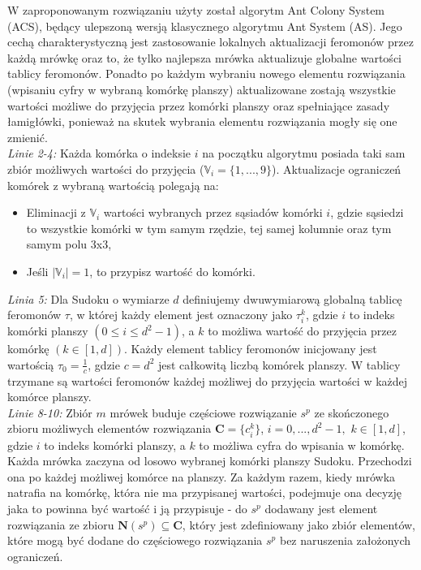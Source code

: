 \documentclass[11pt]{scrartcl} %
\begin{document}
W zaproponowanym rozwiązaniu użyty został algorytm Ant Colony System (ACS), będący ulepszoną wersją klasycznego algorytmu Ant System (AS). Jego cechą charakterystyczną jest zastosowanie lokal\-nych aktualizacji feromonów przez każdą mrówkę oraz to, że tylko najlepsza mrówka aktualizuje globalne wartości tablicy feromonów. Ponadto po każdym wybraniu nowego elementu rozwiązania (wpisaniu cyfry w wybraną komórkę planszy) aktualizowane zostają wszystkie wartości możliwe do przyjęcia przez komórki planszy oraz spełniające zasady łamigłówki, ponieważ na skutek wybrania elementu rozwiązania mogły się one zmienić.\\


\textit{Linie 2-4:} Każda komórka o indeksie $i$ na początku algorytmu posiada taki sam zbiór możliwych wartości do przyjęcia ($\mathbb{V}_i=\{1,...,9\}$). Aktualizacje ograniczeń komórek z wybraną wartością polegają na:
\begin{itemize}
	\item Eliminacji z $\mathbb{V}_i$ wartości wybranych przez sąsiadów komórki $i$, gdzie sąsiedzi to wszystkie komór\-ki w tym samym rzędzie, tej samej kolumnie oraz tym samym polu 3x3, 
	\item Jeśli $|\mathbb{V}_i| = 1$, to przypisz wartość do komórki. 
\end{itemize}


\textit{Linia 5:} Dla Sudoku o wymiarze $d$ definiujemy dwuwymiarową globalną tablicę feromonów $\tau$, w której każdy element jest oznaczony jako $\tau_{i}^{k}$, gdzie $i$ to indeks komórki planszy $(0\leq{i}\leq{d^2-1})$, a $k$ to możliwa wartość do przyjęcia przez komórkę $(k\in{[1,d]})$. Każdy element tablicy feromonów inicjowany jest wartością $\tau_{0}=\frac{1}{c}$, gdzie $c=d^2$ jest całkowitą liczbą komórek planszy. W tablicy trzymane są wartości feromonów każdej możliwej do przyjęcia wartości w każdej komórce planszy.\\

\textit{Linie 8-10:} Zbiór $m$ mrówek buduje częściowe rozwiązanie $s^p$ ze skończonego zbioru możliwych elementów rozwiązania $\textbf{C} = \{c_{i}^{k}\}$, $i=0,...,d^2 -1,$ $k\in{[1,d]}$, gdzie $i$ to indeks komórki planszy, a $k$ to możliwa cyfra do wpisania w komórkę. Każda mrówka zaczyna od losowo wybranej komórki planszy Sudoku. Przechodzi ona po każdej możliwej komórce na planszy. Za każdym razem, kiedy mrówka natrafia na komórkę, która nie ma przypisanej wartości, podejmuje ona decyzję jaka to powinna być wartość i ją przypisuje - do $s^p$ dodawany jest element rozwiązania ze zbioru $\textbf{N}(s^p)\subseteq{\textbf{C}}$, który jest zdefiniowany jako zbiór elementów, które mogą być dodane do częściowego rozwiązania $s^p$ bez naruszenia założonych ograniczeń.\\
\end{document}
